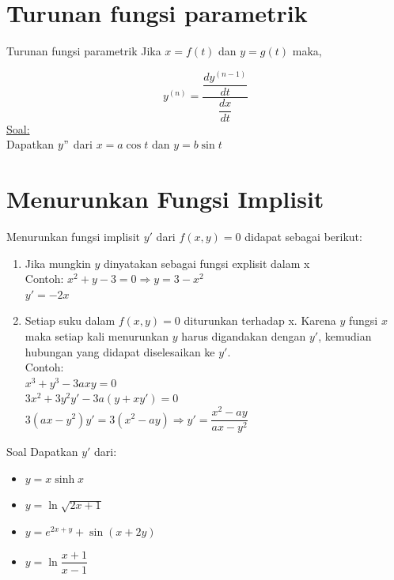 \documentclass{beamer}
\begin{document}
\section{Turunan fungsi parametrik}
\begin{frame}[t, fragile]{Turunan fungsi parametrik}
Jika $x=f(t)$ dan $y=g(t)$ maka, \\
\begin{center}
\end{center}
$$y^{(n)}=\dfrac{\dfrac{dy^{(n-1)}}{dt}}{\dfrac{dx}{dt}}$$
\underline{Soal:}\\
Dapatkan $y"$ dari $x = a \cos t$ dan $y= b \sin t$
\end{frame}

\section{Menurunkan Fungsi Implisit}
\begin{frame}[t, fragile]{Menurunkan fungsi implisit}
$y'$ dari $f(x,y) = 0$ didapat sebagai berikut:
\begin{enumerate}
\item Jika mungkin $y$ dinyatakan sebagai fungsi explisit dalam x \\
      Contoh: $x^2+y-3=0 \Longrightarrow y=3-x^2$\\
        \hspace{132px}$y'=-2x$
\item Setiap suku dalam $f(x,y)=0$ diturunkan terhadap x. Karena $y$ fungsi $x$ maka setiap kali menurunkan $y$ harus digandakan dengan $y'$, kemudian hubungan yang didapat diselesaikan ke $y'$.\\
      Contoh:\\
      $x^3+y^3-3axy=0 $\\
      $3x^2+3y^2y'-3a(y+xy')=0$\\
      $3(ax-y^2)y'=3(x^2-ay) \Longrightarrow y'=\dfrac{x^2-ay}{ax-y^2}$
\end{enumerate}
\end{frame}

\begin{frame}[t, fragile]{Soal}
Dapatkan $y'$ dari:
\begin{itemize}
\item $y=x \sinh{x}$
\item $y=\ln\sqrt{2x+1}$
\item $y=e^{2x+y} + \sin({x+2y})$
\item $y=\ln{\dfrac{x+1}{x-1}}$
\end{itemize}
\end{frame}
\end{document}
